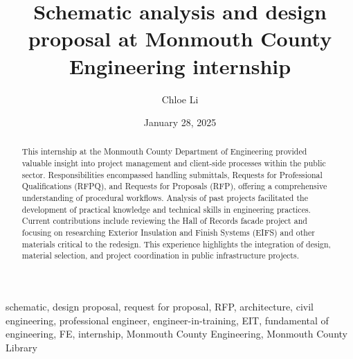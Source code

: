 \documentclass[12pt,conference,onecolumn]{IEEEtran}
\title{Schematic analysis and design proposal at Monmouth County Engineering internship}
\author{Chloe Li}
\date{January 28, 2025}
\newcommand{\keywords}{schematic, design proposal, request for proposal, RFP, architecture, civil engineering, professional engineer, engineer-in-training, EIT, fundamental of engineering, FE, internship, Monmouth County Engineering, Monmouth County Library
}
\begin{document}
\maketitle 

\begin{abstract}
This internship at the Monmouth County Department of Engineering provided valuable insight into project management and client-side processes within the public sector. Responsibilities encompassed handling submittals, Requests for Professional Qualifications (RFPQ), and Requests for Proposals (RFP), offering a comprehensive understanding of procedural workflows. Analysis of past projects facilitated the development of practical knowledge and technical skills in engineering practices. Current contributions include reviewing the Hall of Records facade project and focusing on researching Exterior Insulation and Finish Systems (EIFS) and other materials critical to the redesign. This experience highlights the integration of design, material selection, and project coordination in public infrastructure projects.
\end{abstract}

\begin{IEEEkeywords}
\keywords
\end{IEEEkeywords}
\end{document}
